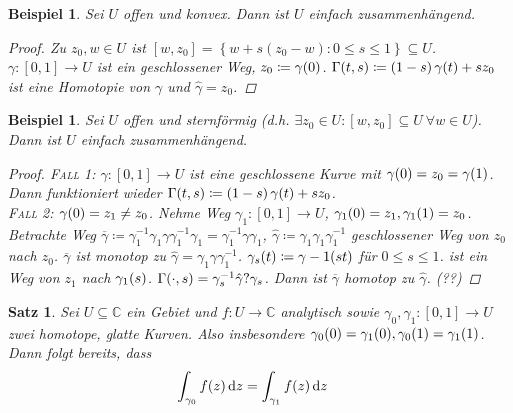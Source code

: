 \documentclass[11pt, a4paper]{article}
\theoremstyle{plain}
\newtheorem{satz}[blockelement]{Satz}
\newtheorem{beispiel}[blockelement]{Beispiel}
\numberwithin{equation}{subsection}
\newcommand{\set}[1]{\left\{#1\right\}}
\newcommand{\pair}[1]{\left(#1\right)}
\newcommand{\of}[1]{\mathopen{}\mathclose{}\bgroup\left(#1\aftergroup\egroup\right)}
\newcommand{\interv}[1]{\left[#1\right]}
\newcommand{\dif}{\mathop{}\!\mathrm{d}}
\newcommand{\C}{\mathbb{C}}
\begin{document}
    \begin{beispiel}
        Sei $U$ offen und konvex. Dann ist $U$ einfach zusammenhängend.
        \begin{proof}
            Zu $z_0, w\in U$ ist $\interv{w, z_0} = \set{w + s\pair{z_0 - w}: 0 \leq s \leq 1} \subseteq U$. $\gamma: \interv{0, 1}\to U$ ist ein geschlossener Weg, $z_0 \coloneqq \gamma\of{0}$. $\Gamma\of{t, s}\coloneqq \pair{1-s}\gamma\of{t} + s z_0$ ist eine Homotopie von $\gamma$ und $\hat{\gamma} = z_0$.
        \end{proof}
    \end{beispiel}

    \begin{beispiel}
        Sei $U$ offen und sternförmig (d.h. $\exists z_0 \in U: \interv{w, z_0}\subseteq U~\forall w\in U$). Dann ist $U$ einfach zusammenhängend.

        \begin{proof}
            \textsc{Fall 1}: $\gamma: \interv{0,1}\to U$ ist eine geschlossene Kurve mit $\gamma\of{0} = z_0 = \gamma\of{1}$. Dann funktioniert wieder $\Gamma\of{t, s}\coloneqq \pair{1-s}\gamma\of{t} + s z_0$.\\
            \textsc{Fall 2}: $\gamma\of{0} = z_1 \neq z_0$. Nehme Weg $\gamma_1: \interv{0, 1}\to U$, $\gamma_1\of{0} = z_1, \gamma_1\of{1} = z_0$. Betrachte Weg $\overline{\gamma}\coloneqq \gamma_1^{-1}\gamma_1 \gamma \gamma_1^{-1}\gamma_1 = \gamma_1^{-1} \gamma\gamma_1$, $\hat{\gamma} \coloneqq \gamma_1 \gamma_1 \gamma_1^{-1}$ geschlossener Weg von $z_0$ nach $z_0$. $\overline{\gamma}$ ist monotop zu $\hat{\gamma} = \gamma_1 \gamma \gamma_1^{-1}$. $\gamma_s\of{t}\coloneqq \gamma-1\of{st}$ für $0\leq s \leq 1$. ist ein Weg von $z_1$ nach $\gamma_1\of{s}$. $\Gamma\of{\cdot, s} = \gamma_s^{-1}\hat{\gamma}?\gamma_s$. Dann ist $\overline{\gamma}$ homotop zu $\hat{\gamma}$. (??)
        \end{proof}
    \end{beispiel}

    \begin{satz} %
        \marginnote{[27. Mai]}
        \label{satz:homotop-int-gleich}
        Sei $U\subseteq\C$ ein Gebiet und $f: U \to\C$ analytisch sowie $\gamma_0, \gamma_1: \interv{0,1}\to U$ zwei homotope, glatte Kurven. Also insbesondere $\gamma_0\of{0} = \gamma_1\of{0}, \gamma_0\of{1} = \gamma_1\of{1}$. Dann folgt bereits, dass
        \begin{align*}
            \int_{\gamma_0}^{} f\of{z} \dif z &= \int_{\gamma_1}^{} f\of{z} \dif z
        \end{align*}
    \end{satz}
\end{document}
